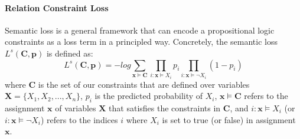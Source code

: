 \paragraph{Relation Constraint Loss}
Semantic loss is a general framework that can encode a propositional logic constraints as a loss term in a principled way.
Concretely, the semantic loss $L^{s}(\bm{C}, \bm{p})$ is defined as:
\begin{equation}
\label{seq:semantic_loss}
	L^{s}(\bm{C}, \bm{p}) = -log\sum\limits_{\bm x\models\bm{C}}\prod\limits_{i:\bm x\models X_i}p_i\prod\limits_{i:\bm x\models \neg X_i}(1-p_i)
\end{equation}
where $\bm{C}$ is the set of our constraints that are defined over variables $\bm{X}=\{X_1, X_2,...,X_n\}$,
$p_i$ is the predicted probability of $X_i$,
$\bm x \models \bm{C}$ refers to the assignment $\bm x$ of variables $\bm X$ that satisfies the constraints in $\bm{C}$,
and $i:\bm x \models X_i$ (or $i:\bm x\models \neg X_i$) refers to the indices $i$ where $X_i$ is set to true (or false) in assignment $\bm x$.


